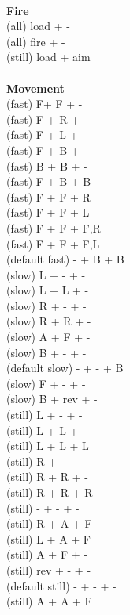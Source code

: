 \ \\ {\bf Fire } \\
(all) load + - \\
(all) fire + - \\
(still) load + aim \\
\ \\ {\bf Movement } \\
(fast) F+ F + - \\
(fast) F + R + - \\
(fast) F + L + - \\
(fast) F + B + - \\
(fast) B + B + - \\
(fast) F + B + B \\
(fast) F + F + R \\
(fast) F + F + L \\
(fast) F + F + F,R \\
(fast) F + F + F,L \\
(default fast) - + B + B \\
(slow) L + - + - \\
(slow) L + L + - \\
(slow) R + - + - \\
(slow) R + R + - \\
(slow) A + F + - \\
(slow) B + - + - \\
(default slow)  - + - + B \\
(slow) F + - + - \\
(slow) B + rev + - \\
(still) L + - + - \\
(still) L + L + - \\
(still) L + L + L \\
(still) R + - + - \\
(still) R + R + - \\
(still) R + R + R \\
(still) - + - + - \\
(still) R + A + F \\
(still) L + A + F \\
(still) A + F + - \\
(still) rev + - + - \\
(default still) - + - + - \\
(still) A + A + F \\



